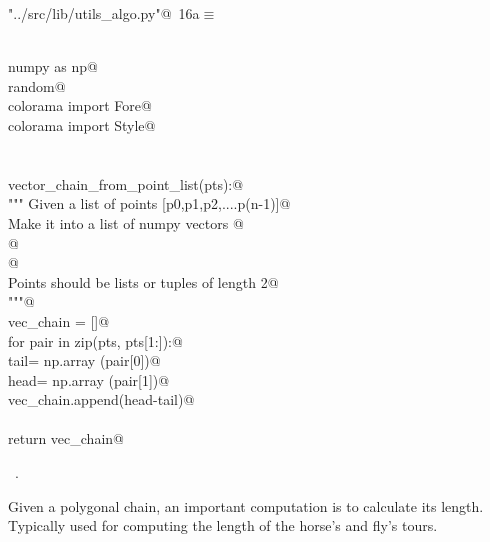 \documentclass[11.5pt]{report}
\begin{document}
\begin{flushleft} \small\label{scrap6}\raggedright\small
{} \verb@"../src/lib/utils_algo.py"@\nobreak\ {\footnotesize {16a}}$\equiv$
\vspace{-1ex}
\begin{list}{}{} \item
\mbox{}\verb@@\\
\mbox{}\verb@import numpy as np@\\
\mbox{}\verb@import random@\\
\mbox{}\verb@from colorama import Fore@\\
\mbox{}\verb@from colorama import Style@\\
\mbox{}\verb@@\\
\mbox{}\verb@@\\
\mbox{}\verb@def vector_chain_from_point_list(pts):@\\
\mbox{}\verb@    """ Given a list of points [p0,p1,p2,....p(n-1)]@\\
\mbox{}\verb@    Make it into a list of numpy vectors @\\
\mbox{}\verb@    [p1-p0, p2-p1,...,p(n-1)-p(n-2)]@\\
\mbox{}\verb@    @\\
\mbox{}\verb@    Points should be lists or tuples of length 2@\\
\mbox{}\verb@    """@\\
\mbox{}\verb@    vec_chain = []@\\
\mbox{}\verb@    for pair in zip(pts, pts[1:]):@\\
\mbox{}\verb@        tail= np.array (pair[0])@\\
\mbox{}\verb@        head= np.array (pair[1])@\\
\mbox{}\verb@        vec_chain.append(head-tail)@\\
\mbox{}\verb@@\\
\mbox{}\verb@    return vec_chain@\\
\mbox{}\verb@@{\NWsep}
\end{list}
\vspace{-1.5ex}
\footnotesize
\begin{list}{}{\setlength{\itemsep}{-\parsep}\setlength{\itemindent}{-\leftmargin}}
\item \NWtxtFileDefBy\ .

\item{}
\end{list}
\vspace{4ex}
\end{flushleft}
\newchunk Given a polygonal chain, an important computation is to calculate 
its length. Typically used for computing the length of the horse's and fly's tours. 
\end{document}
